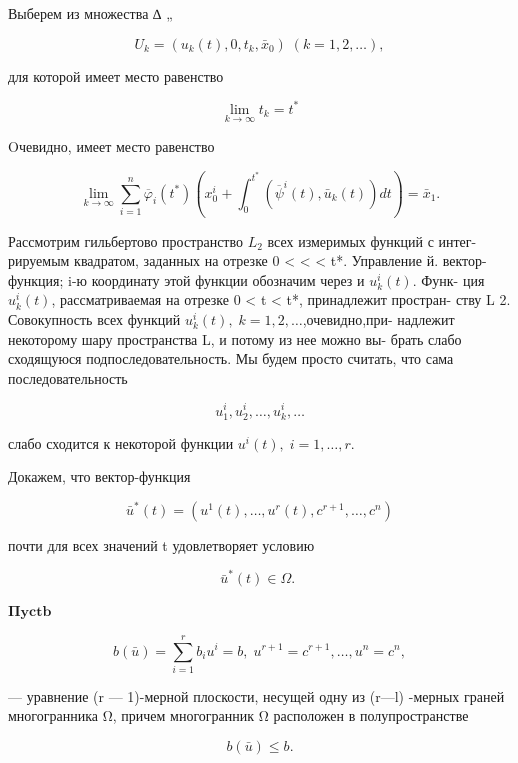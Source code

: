 \documentclass[10pt]{article}
\begin{document}
Выберем из множества ∆ „

\[
{U}_{k} = \left( {{u}_{k}\left( t\right),0,{t}_{k},{\bar{x}}_{0}}\right) \;\left( {k = 1,2,\ldots }\right),
\]

для которой имеет место равенство

\[
\mathop{\lim }\limits_{{k \rightarrow  \infty }}{t}_{k} = {t}^{ * }
\]

Oчевидно, имеет место равенство

\[
\mathop{\lim }\limits_{{k \rightarrow  \infty }}\mathop{\sum }\limits_{{i = 1}}^{n}{\overline{\varphi }}_{i}\left( {t}^{ * }\right) \left( {{x}_{0}^{i} + {\int }_{0}^{{t}^{ * }}\left( {{\overline{\psi }}^{i}\left( t\right),{\bar{u}}_{k}\left( t\right) }\right) {dt}}\right)  = {\bar{x}}_{1}. \tag{52}
\]

Рассмотрим гильбертово пространство \({L}_{2}\) всех измеримых функций с интег- рируемым квадратом, заданных на отрезке 0 < < < t*. Управление й. вектор-функция; i-ю координату этой функции обозначим через и \({u}_{k}^{i}\left( t\right)\). Функ- ция \({u}_{k}^{i}\left( t\right)\), рассматриваемая на отрезке 0 < t < t*, принадлежит простран- ству L 2. Совокупность всех функций \({u}_{k}^{i}\left( t\right),\;k = 1,2,\ldots\),очевидно,при- надлежит некоторому шару пространства L, и потому из нее можно вы- брать слабо сходящуюся подпоследовательность. Мы будем просто считать, что сама последовательность

\[
{u}_{1}^{i},{u}_{2}^{i},\ldots,{u}_{k}^{i},\ldots
\]

слабо сходится к некоторой функции \({u}^{i}\left( t\right),\;i = 1,\ldots,r\).

Докажем, что вектор-функция

\[
{\bar{u}}^{ * }\left( t\right)  = \left( {{u}^{1}\left( t\right),\ldots,{u}^{r}\left( t\right),{c}^{r + 1},\ldots,{c}^{n}}\right) \tag{53}
\]

почти для всех значений t удовлетворяет условию

\[
{\bar{u}}^{ * }\left( t\right)  \in  \Omega \text{. }
\]

\(\mathbf{{\Pi yctb}}\)

\[
b\left( \bar{u}\right)  = \mathop{\sum }\limits_{{i = 1}}^{r}{b}_{i}{u}^{i} = b,\;{u}^{r + 1} = {c}^{r + 1},\ldots,{u}^{n} = {c}^{n},
\]

— уравнение (r — 1)-мерной плоскости, несущей одну из (r—l) -мерных граней многогранника Ω, причем многогранник Ω расположен в полупространстве

\[
b\left( \bar{u}\right)  \leq  b.
\]
\end{document}
